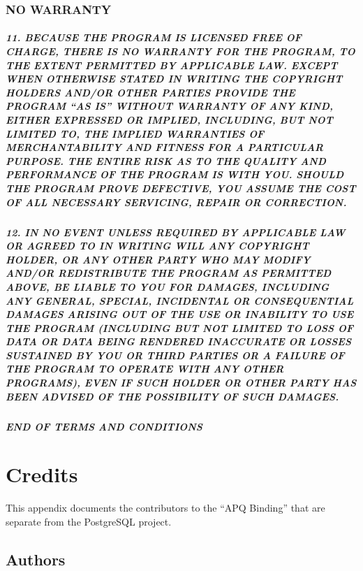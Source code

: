 \documentclass[english,letterpaper]{book}
\begin{document}
\subsection*{NO WARRANTY}


\paragraph{11. BECAUSE THE PROGRAM IS LICENSED FREE OF CHARGE, THERE IS NO WARRANTY
FOR THE PROGRAM, TO THE EXTENT PERMITTED BY APPLICABLE LAW. EXCEPT
WHEN OTHERWISE STATED IN WRITING THE COPYRIGHT HOLDERS AND/OR OTHER
PARTIES PROVIDE THE PROGRAM ``AS IS'' WITHOUT WARRANTY
OF ANY KIND, EITHER EXPRESSED OR IMPLIED, INCLUDING, BUT NOT LIMITED
TO, THE IMPLIED WARRANTIES OF MERCHANTABILITY AND FITNESS FOR A PARTICULAR
PURPOSE. THE ENTIRE RISK AS TO THE QUALITY AND PERFORMANCE OF THE
PROGRAM IS WITH YOU. SHOULD THE PROGRAM PROVE DEFECTIVE, YOU ASSUME
THE COST OF ALL NECESSARY SERVICING, REPAIR OR CORRECTION.}


\paragraph{12. IN NO EVENT UNLESS REQUIRED BY APPLICABLE LAW OR AGREED TO IN
WRITING WILL ANY COPYRIGHT HOLDER, OR ANY OTHER PARTY WHO MAY MODIFY
AND/OR REDISTRIBUTE THE PROGRAM AS PERMITTED ABOVE, BE LIABLE TO YOU
FOR DAMAGES, INCLUDING ANY GENERAL, SPECIAL, INCIDENTAL OR CONSEQUENTIAL
DAMAGES ARISING OUT OF THE USE OR INABILITY TO USE THE PROGRAM (INCLUDING
BUT NOT LIMITED TO LOSS OF DATA OR DATA BEING RENDERED INACCURATE
OR LOSSES SUSTAINED BY YOU OR THIRD PARTIES OR A FAILURE OF THE PROGRAM
TO OPERATE WITH ANY OTHER PROGRAMS), EVEN IF SUCH HOLDER OR OTHER
PARTY HAS BEEN ADVISED OF THE POSSIBILITY OF SUCH DAMAGES.}


\paragraph{END OF TERMS AND CONDITIONS}



\chapter{Credits}

This appendix documents the contributors to the ``APQ Binding''
that are separate from the PostgreSQL project.


\section*{Authors}
\end{document}
